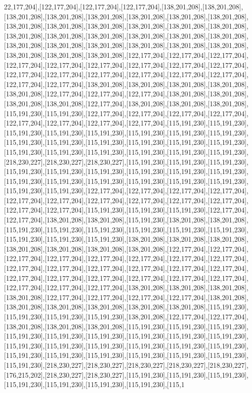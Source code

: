 22,177,204],[122,177,204],[122,177,204],[122,177,204],[138,201,208],[138,201,208],[138,201,208],[138,201,208],[138,201,208],[138,201,208],[138,201,208],[138,201,208],[138,201,208],[138,201,208],[138,201,208],[138,201,208],[138,201,208],[138,201,208],[138,201,208],[138,201,208],[138,201,208],[138,201,208],[138,201,208],[138,201,208],[138,201,208],[138,201,208],[138,201,208],[138,201,208],[138,201,208],[138,201,208],[138,201,208],[138,201,208],[138,201,208],[122,177,204],[122,177,204],[122,177,204],[122,177,204],[122,177,204],[122,177,204],[122,177,204],[122,177,204],[122,177,204],[122,177,204],[122,177,204],[122,177,204],[122,177,204],[122,177,204],[122,177,204],[122,177,204],[122,177,204],[138,201,208],[138,201,208],[138,201,208],[138,201,208],[138,201,208],[122,177,204],[122,177,204],[122,177,204],[138,201,208],[138,201,208],[138,201,208],[138,201,208],[122,177,204],[138,201,208],[138,201,208],[138,201,208],[115,191,230],[115,191,230],[122,177,204],[122,177,204],[122,177,204],[122,177,204],[122,177,204],[122,177,204],[122,177,204],[122,177,204],[115,191,230],[115,191,230],[115,191,230],[115,191,230],[115,191,230],[115,191,230],[115,191,230],[115,191,230],[115,191,230],[115,191,230],[115,191,230],[115,191,230],[115,191,230],[115,191,230],[115,191,230],[115,191,230],[115,191,230],[115,191,230],[115,191,230],[115,191,230],[218,230,227],[218,230,227],[218,230,227],[115,191,230],[115,191,230],[115,191,230],[115,191,230],[115,191,230],[115,191,230],[115,191,230],[115,191,230],[115,191,230],[115,191,230],[115,191,230],[115,191,230],[115,191,230],[115,191,230],[115,191,230],[115,191,230],[115,191,230],[122,177,204],[122,177,204],[122,177,204],[122,177,204],[122,177,204],[122,177,204],[122,177,204],[122,177,204],[122,177,204],[122,177,204],[122,177,204],[122,177,204],[115,191,230],[115,191,230],[115,191,230],[122,177,204],[122,177,204],[138,201,208],[138,201,208],[115,191,230],[138,201,208],[138,201,208],[115,191,230],[115,191,230],[115,191,230],[115,191,230],[115,191,230],[115,191,230],[115,191,230],[115,191,230],[115,191,230],[138,201,208],[138,201,208],[138,201,208],[138,201,208],[138,201,208],[138,201,208],[138,201,208],[122,177,204],[122,177,204],[122,177,204],[122,177,204],[122,177,204],[122,177,204],[122,177,204],[122,177,204],[122,177,204],[122,177,204],[122,177,204],[122,177,204],[122,177,204],[122,177,204],[122,177,204],[122,177,204],[122,177,204],[122,177,204],[122,177,204],[122,177,204],[122,177,204],[122,177,204],[122,177,204],[138,201,208],[138,201,208],[138,201,208],[138,201,208],[122,177,204],[122,177,204],[122,177,204],[122,177,204],[138,201,208],[138,201,208],[138,201,208],[138,201,208],[138,201,208],[138,201,208],[115,191,230],[115,191,230],[115,191,230],[115,191,230],[138,201,208],[122,177,204],[122,177,204],[138,201,208],[138,201,208],[138,201,208],[115,191,230],[115,191,230],[115,191,230],[115,191,230],[115,191,230],[115,191,230],[115,191,230],[115,191,230],[115,191,230],[115,191,230],[115,191,230],[115,191,230],[115,191,230],[115,191,230],[115,191,230],[115,191,230],[115,191,230],[115,191,230],[115,191,230],[115,191,230],[115,191,230],[115,191,230],[218,230,227],[218,230,227],[218,230,227],[218,230,227],[218,230,227],[176,215,202],[218,230,227],[218,230,227],[115,191,230],[115,191,230],[115,191,230],[115,191,230],[115,191,230],[115,191,230],[115,191,230],[115,1